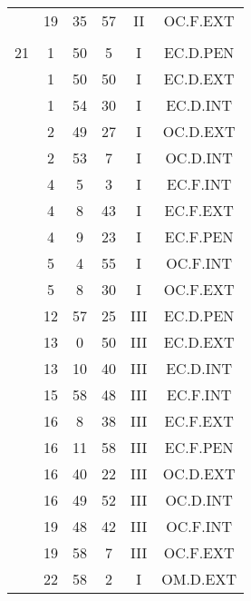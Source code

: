 \documentclass[12pt, a4paper]{article}
\begin{document}
\begin{multicols}{3}
{\begin{tabular}{c c c c c c}
	 	 	 	 & 19 & 35 & 57 & II & OC.F.EXT\\%
	 	 	 	 & & & & & \\%
	 	 	 	21 & 1 & 50 & 5 & I & EC.D.PEN\\%
	 	 	 	 & 1 & 50 & 50 & I & EC.D.EXT\\%
	 	 	 	 & 1 & 54 & 30 & I & EC.D.INT\\%
	 	 	 	 & 2 & 49 & 27 & I & OC.D.EXT\\%
	 	 	 	 & 2 & 53 & 7 & I & OC.D.INT\\%
	 	 	 	 & 4 & 5 & 3 & I & EC.F.INT\\%
	 	 	 	 & 4 & 8 & 43 & I & EC.F.EXT\\%
	 	 	 	 & 4 & 9 & 23 & I & EC.F.PEN\\%
	 	 	 	 & 5 & 4 & 55 & I & OC.F.INT\\%
	 	 	 	 & 5 & 8 & 30 & I & OC.F.EXT\\%
	 	 	 	 & 12 & 57 & 25 & III & EC.D.PEN\\%
	 	 	 	 & 13 & 0 & 50 & III & EC.D.EXT\\%
	 	 	 	 & 13 & 10 & 40 & III & EC.D.INT\\%
	 	 	 	 & 15 & 58 & 48 & III & EC.F.INT\\%
	 	 	 	 & 16 & 8 & 38 & III & EC.F.EXT\\%
	 	 	 	 & 16 & 11 & 58 & III & EC.F.PEN\\%
	 	 	 	 & 16 & 40 & 22 & III & OC.D.EXT\\%
	 	 	 	 & 16 & 49 & 52 & III & OC.D.INT\\%
	 	 	 	 & 19 & 48 & 42 & III & OC.F.INT\\%
	 	 	 	 & 19 & 58 & 7 & III & OC.F.EXT\\%
	 	 	 	 & 22 & 58 & 2 & I & OM.D.EXT\\%

\end{tabular}}
\end{multicols}
\end{document}

